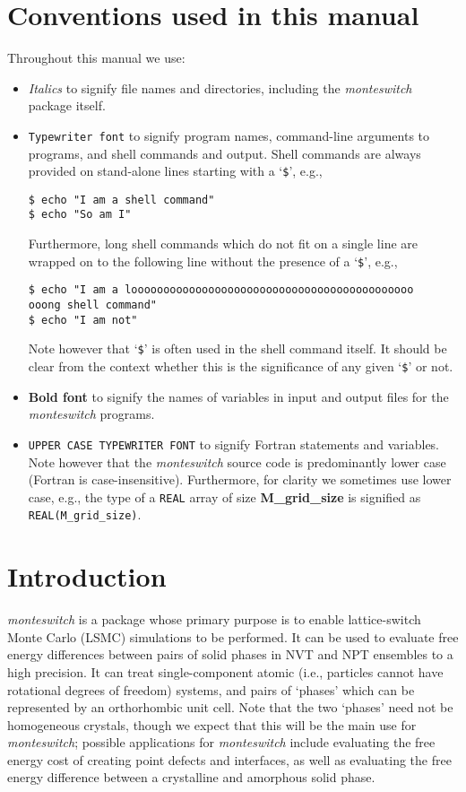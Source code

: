 \documentclass{report}
\begin{document}
\chapter*{Conventions used in this manual}
Throughout this manual we use:
\begin{itemize}
\item \emph{Italics} to signify file names and directories, including the \emph{monteswitch} package itself.
\item \texttt{Typewriter font} to signify program names, command-line arguments to programs, and shell commands and output.
Shell commands are always provided on stand-alone lines starting with a `\verb|$|', e.g.,
\begin{verbatim}
$ echo "I am a shell command"
$ echo "So am I"
\end{verbatim}
Furthermore, long shell commands which do not fit on a single line are wrapped on to the following line without the presence of
a `\verb|$|', e.g.,
\begin{verbatim}
$ echo "I am a loooooooooooooooooooooooooooooooooooooooooooo
ooong shell command"
$ echo "I am not"
\end{verbatim}
Note however that `\verb|$|' is often used in the shell command itself. It should be clear from the context whether this is the
significance of any given `\verb|$|' or not.
\item \textbf{Bold font} to signify the names of variables in input and output files for the \emph{monteswitch} programs.
\item \texttt{UPPER CASE TYPEWRITER FONT} to signify Fortran statements and variables. Note however that the \emph{monteswitch} 
source code is predominantly lower case (Fortran is case-insensitive). Furthermore, for clarity we sometimes use lower case, e.g.,
the type of a \texttt{REAL} array of size \textbf{M\_grid\_size} is signified as \texttt{REAL(M\_grid\_size)}.
\end{itemize}


\chapter{Introduction}
\emph{monteswitch} is a package whose primary purpose is to enable lattice-switch Monte Carlo (LSMC) \cite{Bruce_1997,Bruce_2000}
simulations to be performed. 
%
It can be used to evaluate free energy differences between pairs of solid phases in NVT and NPT 
ensembles to a high precision. It can treat single-component atomic (i.e., particles cannot have rotational degrees of freedom) systems, and 
pairs of `phases' 
which can be represented by an orthorhombic unit cell. Note that the two `phases' need not be homogeneous crystals, though we expect that this
will be the main use for \emph{monteswitch}; possible applications for \emph{monteswitch} include evaluating the free energy cost of creating
point defects and interfaces, as well as evaluating the free energy difference between a crystalline and amorphous solid phase.
\end{document}
